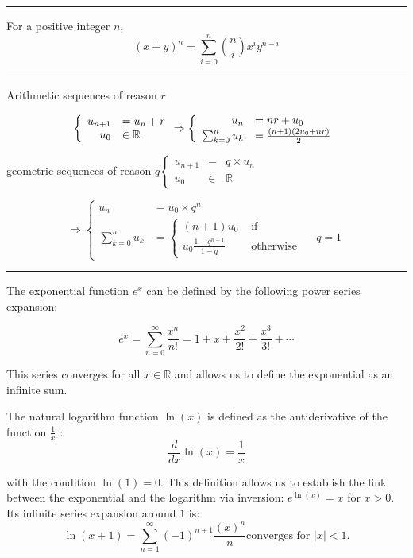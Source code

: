 \hrule
\begin{f}
	
	For a positive integer \(n\),
	\[
	(x+y)^n=\sum_{i=0}^n\binom{n}{i} x^i y^{n-i}
	\]
	
\end{f}
\hrule
\begin{f}[Sequences]  
	
	Arithmetic sequences of reason \(r\)
	
	\[
	\left\{\begin{array} { r l } 
		{ u _ { n + 1 } } & { = u _ { n } + r } \\
		{ u _ { 0 } } & { \in \mathbb { R } }
	\end{array} \Rightarrow \left\{\begin{array}{rl}
		u_n & =n r+u_0 \\
		\sum_{k=0}^n u_k & =\frac{(n+1)\left(2 u_0+n r\right)}{2}
	\end{array}\right.\right.
	\]
	
	geometric sequences of reason \(q\left\{\begin{array}{rll}u_{n+1} & = & q \times u_n \\ u_0 & \in & \mathbb{R}\end{array}\right.\)
	
	\[
	\Rightarrow\left\{\begin{array}{rlr}
		u_n & =u_0 \times q^n \\
		\sum_{k=0}^n u_k & =\left\{\begin{array}{rl}
			(n+1) u_0 & \text { if } \\
			u_0 \frac{1-q^{n+1}}{1-q} & \text { otherwise }
		\end{array} \quad q=1\right.
	\end{array}\right.
	\]
	
\end{f}
\hrule
\begin{f}
	The exponential function \( e^x \) can be defined by the following power series expansion:
	
	\[
	e^x = \sum_{n=0}^{\infty} \frac{x^n}{n!} = 1 + x + \frac{x^2}{2!} + \frac{x^3}{3!} + \cdots
	\]
	
	This series converges for all \( x \in \mathbb{R} \) and allows us to define the exponential as an infinite sum.
	
	
	The natural logarithm function \( \ln(x) \) is defined as the antiderivative of the function \( \frac{1}{x} \) :	
	\[
	\frac{d}{dx} \ln(x) = \frac{1}{x}
	\]
	
	with the condition \( \ln(1) = 0 \). This definition allows us to establish the link between the exponential and the logarithm via inversion: \( e^{\ln(x)} = x \) for \( x > 0 \).
	Its infinite series expansion around \(1\) is:
	\[
	\ln(x+1) = \sum_{n=1}^{\infty} (-1)^{n+1}\frac{(x)^n}{n}%
	\text{converges for \(\lvert x\rvert < 1\).}
	\]
	
\end{f}



